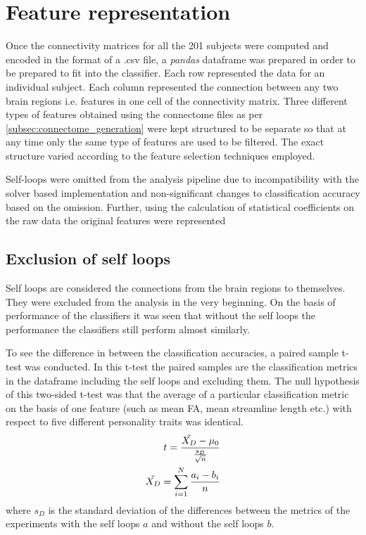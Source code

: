 \documentclass[msthesis.tex]{subfiles}
\begin{document}

\section{Feature representation}
Once the connectivity matrices for all the 201 subjects were computed and encoded in the format of a .csv file, a \textit{pandas} dataframe was prepared in order to be prepared to fit into the classifier. Each row represented the data for an individual subject. Each column represented the connection between any two brain regions i.e. features in one cell of the connectivity matrix. Three different types of features obtained using the connectome files as per \ref{subsec:connectome_generation} were kept structured to be separate so that at any time only the same type of features are used to be filtered.
The exact structure varied according to the feature selection techniques employed.

Self-loops were omitted from the analysis pipeline due to incompatibility with the solver based implementation and non-significant changes to classification accuracy based on the omission. Further, using the calculation of statistical coefficients on the raw data the original features were represented 

\subsection{Exclusion of self loops}
\label{sec:exclusion}
Self loops are considered the connections from the brain regions to themselves. They were excluded from the analysis in the very beginning. On the basis of performance of the classifiers it was seen that without the self loops the performance the classifiers still perform almost similarly.

To see the difference in between the classification accuracies, a paired sample t-test was conducted. In this t-test the paired samples are the classification metrics in the dataframe including the self loops and excluding them. The null hypothesis of this two-sided t-test was that the average of a particular classification metric on the basis of one feature (such as mean FA, mean streamline length etc.) with respect to five different personality traits was identical.
\begin{align}
    \label{eq:pairedtest}
    t = \frac{\Tilde{X_{D}} - \mu_0}{\frac{s_{D}}{\sqrt{n}}} \\
    \Tilde{X_D} = \sum_{i=1}^{N} \frac{a_{i} - b_{i}}{n}
\end{align}
where $s_D$ is the standard deviation of the differences between the metrics of the experiments with the self loops $a$ and without the self loops $b$. 
\end{document}
